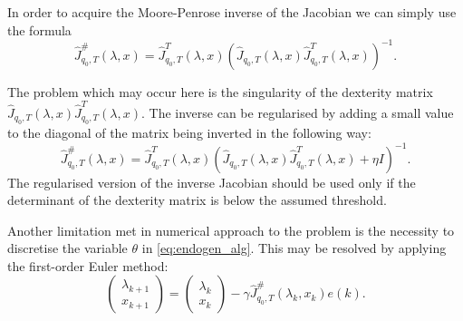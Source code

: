 In order to acquire the Moore-Penrose inverse of the Jacobian we can simply use the formula
\begin{equation}
\hat J^\#_{q_0, T}(\lambda, x)=\hat J^T_{q_0, T}(\lambda, x)\left(\hat J_{q_0, T}(\lambda, x)\hat J^T_{q_0, T}(\lambda, x)\right)^{-1}.
\end{equation}

The problem which may occur here is the singularity of the dexterity matrix\\
$\hat J_{q_0, T}(\lambda, x)\hat J^T_{q_0, T}(\lambda, x)$. The inverse can be regularised by adding a small value to the diagonal of the matrix being inverted in the following way:
\begin{equation}
\hat J^\#_{q_0, T}(\lambda, x)=\hat J^T_{q_0, T}(\lambda, x)\left(\hat J_{q_0, T}(\lambda, x)\hat J^T_{q_0, T}(\lambda, x)+\eta I\right)^{-1}.
\end{equation}
The regularised version of the inverse Jacobian should be used only if the determinant of the dexterity matrix is below the assumed threshold.

Another limitation met in numerical approach to the problem is the necessity to discretise the variable $\theta$ in \eqref{eq:endogen_alg}.
This may be resolved by applying the first-order Euler method:
\begin{equation}
\begin{pmatrix}
\lambda_{k+1}\\
x_{k+1}
\end{pmatrix}  =\begin{pmatrix}\lambda_{k}\\
x_{k}
\end{pmatrix} - \gamma \hat J^\#_{q_0, T}(\lambda_k, x_k)e(k).
\end{equation}